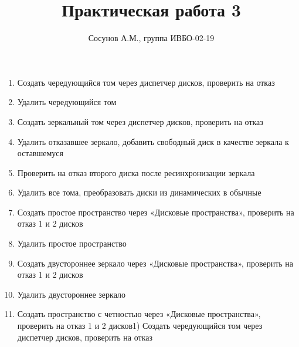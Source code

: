 \documentclass[a4paper, 12pt]{article}
\date{}\usepackage{graphicx}
\title{Практическая работа 3}
\author{Сосунов А.М., группа ИВБО-02-19}
\date{}
\begin{document}
	\maketitle
	
	\begin{enumerate}
		\item Создать чередующийся том через диспетчер дисков, проверить на
		отказ
		
		\item Удалить чередующийся том
		\item Создать зеркальный том через диспетчер дисков, проверить на
		отказ
		\item Удалить отказавшее зеркало, добавить свободный диск в качестве
		зеркала к оставшемуся
		\item Проверить на отказ второго диска после ресинхронизации зеркала
		\item Удалить все тома, преобразовать диски из динамических в
		обычные
		\item Создать простое пространство через «Дисковые пространства»,
		проверить на отказ 1 и 2 дисков
		\item Удалить простое пространство
		\item Создать двустороннее зеркало через «Дисковые пространства»,
		проверить на отказ 1 и 2 дисков
		\item Удалить двустороннее зеркало
		\item Создать пространство с четностью через «Дисковые
		пространства», проверить на отказ 1 и 2 дисков1) Создать чередующийся том через диспетчер дисков, проверить на
		отказ
	\end{enumerate}
\end{document}
